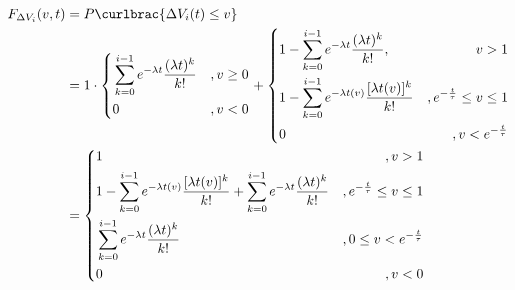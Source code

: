\documentclass[11pt]{article}
\begin{document}
\begin{align}
  \begin{aligned}
    F_{\Delta V_i}(v,t) & =P\curlbrac{\Delta V_i(t)\le v}                                                                                                                                                                       \\
                        & =1\cdot\left\{
    \begin{aligned}
       & \sum_{k=0}^{i-1}e^{-\lambda t}\frac{(\lambda t)^k}{k!} & ,v\ge 0 \\
       & 0                                                      & ,v< 0
    \end{aligned}\right.+\left\{\begin{aligned}
                                   & 1-\sum_{k=0}^{i-1}e^{-\lambda t}\frac{(\lambda t)^k}{k!},      & v>1                    \\
                                   & 1-\sum_{k=0}^{i-1}e^{-\lambda t(v)}\frac{[\lambda t(v)]^k}{k!}
                                   & ,e^{-\frac{t}{\tau}}\le v\le 1                                                          \\
                                   & 0                                                              & ,v<e^{-\frac{t}{\tau}}
                                \end{aligned} \right.                                                                              \\
                        & =\left\{\begin{aligned}
                                     & 1                                                                                                                     & ,v>1                              \\
                                     & 1-\sum_{k=0}^{i-1}e^{-\lambda t(v)}\frac{[\lambda t(v)]^k}{k!}+\sum_{k=0}^{i-1}e^{-\lambda t}\frac{(\lambda t)^k}{k!} & , e^{-\frac{t}{\tau}} \le v \le 1 \\
                                     & \sum_{k=0}^{i-1}e^{-\lambda t}\frac{(\lambda t)^k}{k!}                                                                & ,0\le v<e^{-\frac{t}{\tau}}       \\
                                     & 0                                                                                                                     & ,v<0
                                  \end{aligned}\right.
  \end{aligned}
\end{align}\par
\end{document}
